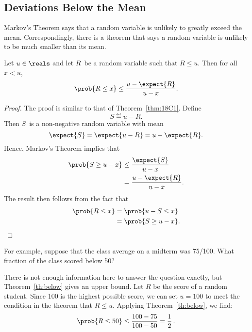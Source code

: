\subsection{Deviations Below the Mean}

Markov's Theorem says that a random variable is unlikely to greatly exceed
the mean.  Correspondingly, there is a theorem that says a random variable
is unlikely to be much smaller than its mean.

\begin{theorem}
\label{th:below}
Let $u \in \reals$ and let $R$~be a random variable such that $R \leq
u$.  Then for all~$x < u$, 
\[
    \prob{R \leq x} \leq \frac{u - \expect{R}}{u - x}.
\]
\end{theorem}

\begin{proof}
The proof is similar to that of Theorem~\ref{thm:18C1}.  Define
\begin{equation*}
    S \eqdef u - R.
\end{equation*}
Then $S$~is a non-negative random variable with mean
\begin{equation*}
    \expect{S} = \expect{u - R} = u - \expect{R}.
\end{equation*}
Hence, Markov's Theorem implies that
\begin{align*}
\prob{S \ge u - x}
    & \le \frac{\expect{S}}{u - x} \\
    &= \frac{u - \expect{R}}{u - x}.
\end{align*}
The result then follows from the fact that
\begin{align*}
\prob{R \le x}
    &= \prob{u - S \le x} \\
    &= \prob{S \ge u - x}. \qedhere
\end{align*}
\end{proof}

For example, suppose that the class average on a midterm was
75/100.  What fraction of the class scored below 50?

There is not enough information here to answer the question exactly,
but Theorem~\ref{th:below} gives an upper bound.  Let $R$ be the score
of a random student.  Since 100 is the highest possible score, we can
set $u = 100$ to meet the condition in the theorem that $R \leq u$.
Applying Theorem~\ref{th:below}, we find:
\begin{equation*}
  \prob{R \leq 50} \leq \frac{100 - 75}{100 - 50} = \frac{1}{2}\,.
\end{equation*}

